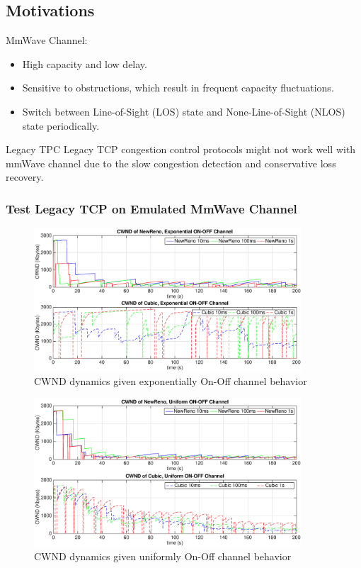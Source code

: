 \documentclass{beamer}
\begin{document}
\subsection{Motivations}
\begin{frame}
MmWave Channel:
\begin{itemize} 
\item High capacity and low delay.
\item Sensitive to obstructions, which result in frequent capacity fluctuations.
\item Switch between Line-of-Sight (LOS) state and None-Line-of-Sight (NLOS) state periodically.
\end{itemize}
\begin{block}{Legacy TPC}
Legacy TCP congestion control protocols might not work well with mmWave channel due to the slow congestion detection and conservative loss recovery.
\end{block}
\end{frame}
\begin{frame}
\frametitle{Test Legacy TCP on Emulated MmWave Channel}
\begin{figure}
\centering
\includegraphics[width=10cm]{1.eps}
\caption{CWND dynamics given exponentially On-Off channel behavior}
\label{1st}
\end{figure}
\end{frame}
\begin{frame}
\begin{figure}
\centering
\includegraphics[width=10cm]{3.eps}
\caption{CWND dynamics given uniformly On-Off channel behavior}
\label{3rd}
\end{figure}

\end{frame}
\end{document}
